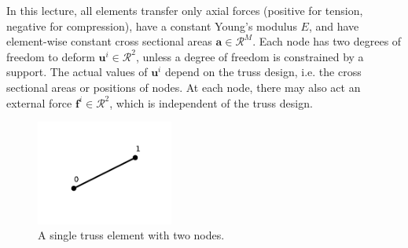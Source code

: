 In this lecture, all elements transfer only axial forces (positive for tension, negative for compression), have a constant Young's modulus $E$, and have element-wise constant cross sectional areas $\mathbf{a} \in \mathcal{R}^M$. Each node has two degrees of freedom to deform $\mathbf{u}^i \in \mathcal{R}^2$, unless a degree of freedom is constrained by a support. The actual values of $\mathbf{u}^i$ depend on the truss design, i.e. the cross sectional areas or positions of nodes. At each node, there may also act an external force $\mathbf{f}^i \in \mathcal{R}^2$, which is independent of the truss design.

\begin{figure}[!htpb]
    \centering
    \includegraphics[width=0.4\textwidth]{figures/single_truss.pdf}
    \caption{A single truss element with two nodes.}
    \label{fig:single_truss}
\end{figure}


